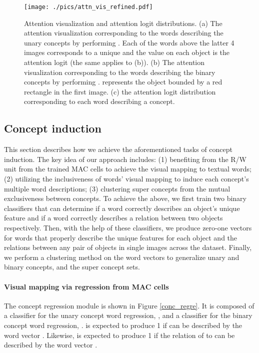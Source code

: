 \documentclass[10pt,twocolumn,letterpaper]{article}
\begin{document}
\begin{figure*}
\centering
\texttt{[image: ./pics/attn\_vis\_refined.pdf]}
\caption{\small{Attention visualization and attention logit distributions. (a) The attention visualization corresponding to the words describing the unary concepts by performing . Each of the words above the latter 4 images corresponds to a unique  and the value on each object is the attention logit (the same applies to (b)). (b) The attention visualization corresponding to the words describing the binary concepts by performing .  represents the object bounded by a red rectangle in the first image. (c) the attention logit distribution corresponding to each word describing a concept. }}
\label{attn_vis}
\vspace{-6mm}
\end{figure*}

\subsection{Concept induction}
\vspace{-2mm}
\label{ssec:concept_induction}
This section describes how we achieve the aforementioned tasks of concept induction. The key idea of our approach includes: (1) benefiting from the R/W unit from the trained MAC cells to achieve the visual mapping to textual words; (2) utilizing the inclusiveness of words' visual mapping to induce each concept's multiple word descriptions; (3) clustering super concepts from the mutual exclusiveness between concepts.
To achieve the above, we first train two binary classifiers that can determine if a word correctly describes an object's unique feature and if a word correctly describes a relation between two objects respectively. Then, with the help of these classifiers, we produce zero-one vectors for words that properly describe the unique features for each object and the relations between any pair of objects in single images across the dataset. Finally, we perform a clustering method on the word vectors to generalize unary and binary concepts, and the super concept sets.

\vspace{-5mm}
\paragraph{Visual mapping via regression from MAC cells}
The concept regression module is shown in Figure \ref{conc_regre}. It is composed of a classifier for the unary concept word regression, , and a classifier for the binary concept word regression, .  is expected to produce 1 if  can be described by the word vector . Likewise,  is expected to produce 1 if the relation of  to  can be described by the word vector  . 
\end{document}
